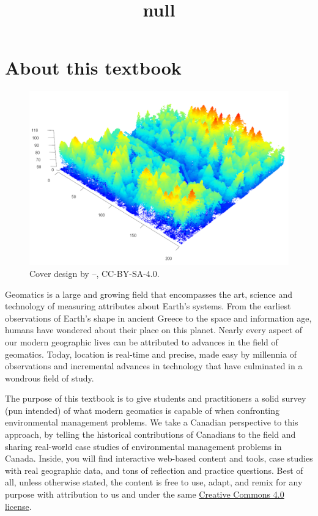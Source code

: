 \documentclass[
]{book}
\title{null}
\author{}
\date{\vspace{-2.5em}}
\begin{document}
\maketitle

{
\setcounter{tocdepth}{1}
\tableofcontents
}
\hypertarget{about-this-textbook}{%
\chapter*{About this textbook}\label{about-this-textbook}}

\begin{figure}
\includegraphics[width=0.75\linewidth]{images/15-las-denoise} \caption{Cover design by --, CC-BY-SA-4.0.}\label{fig:00-book-cover}
\end{figure}

Geomatics is a large and growing field that encompasses the art, science and technology of measuring attributes about Earth's systems. From the earliest observations of Earth's shape in ancient Greece to the space and information age, humans have wondered about their place on this planet. Nearly every aspect of our modern geographic lives can be attributed to advances in the field of geomatics. Today, location is real-time and precise, made easy by millennia of observations and incremental advances in technology that have culminated in a wondrous field of study.

The purpose of this textbook is to give students and practitioners a solid survey (pun intended) of what modern geomatics is capable of when confronting environmental management problems. We take a Canadian perspective to this approach, by telling the historical contributions of Canadians to the field and sharing real-world case studies of environmental management problems in Canada. Inside, you will find interactive web-based content and tools, case studies with real geographic data, and tons of reflection and practice questions. Best of all, unless otherwise stated, the content is free to use, adapt, and remix for any purpose with attribution to us and under the same \href{https://creativecommons.org/licenses/by-sa/4.0/}{Creative Commons 4.0 license}.
\end{document}
